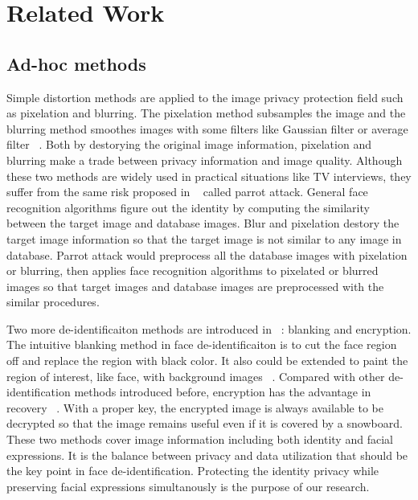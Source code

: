\chapter{Related Work}

\section{Ad-hoc methods}
	Simple distortion methods are applied to the image privacy protection field such as pixelation and blurring. The pixelation method subsamples the image and the blurring method smoothes images with some filters like Gaussian filter or average filter ~\cite{Agrawal09,Boyle00}. Both by destorying the original image information, pixelation and blurring make a trade between privacy information and image quality. Although these two methods are widely used in practical situations like TV interviews, they suffer from the same risk proposed in ~\cite{Newton05} called parrot attack. General face recognition algorithms figure out the identity by computing the similarity between the target image and database images. Blur and pixelation destory the target image information so that the target image is not similar to any image in database. Parrot attack would preprocess all the database images with pixelation or blurring, then applies face recognition algorithms to pixelated or blurred images so that target images and database images are preprocessed with the similar procedures. 

	\par
	Two more de-identificaiton methods are introduced in ~\cite{Winkler14}: blanking and encryption. The intuitive blanking method in face de-identificaiton is to cut the face region off and replace the region with black color. It also could be extended to paint the region of interest, like face, with background images  ~\cite{inpaint09,Qureshi09}. Compared with other de-identification methods introduced before, encryption has the advantage in recovery ~\cite{Boult05}. With a proper key, the encrypted image is always available to be decrypted so that the image remains useful even if it is covered by a snowboard. These two methods cover image information including both identity and facial expressions. It is the balance between privacy and data utilization that should be the key point in face de-identification. Protecting the identity privacy while preserving facial expressions simultanously is the purpose of our research. 
	
